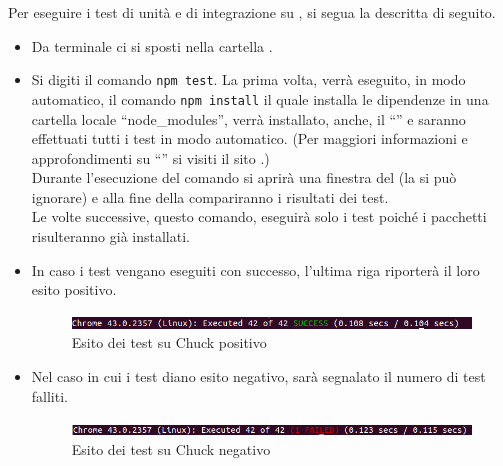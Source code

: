 				Per eseguire i test di unità e di integrazione su , si segua la  descritta di seguito.
					\begin{itemize}
						\item Da terminale ci si sposti nella cartella .
						\item Si digiti il comando \texttt{npm test}. La prima volta, verrà eseguito, in modo automatico, il comando \texttt{npm install} il quale installa le dipendenze in una cartella locale “node\_modules”, verrà installato, anche, il  “” e saranno effettuati tutti i test in modo automatico. (Per maggiori informazioni e approfondimenti su “” si visiti il sito .) \\
						Durante l'esecuzione del comando si aprirà una finestra del  (la si può ignorare) e alla fine della  compariranno i risultati dei test. \\
						Le volte successive, questo comando, eseguirà solo i test poiché i pacchetti risulteranno già installati. \\
						\item In caso i test vengano eseguiti con successo, l'ultima riga riporterà il loro esito positivo.
							\begin{figure}[H]
								\centering
								\includegraphics[scale=0.5]{Pics/testPassed.png}
								\caption{Esito dei test su Chuck positivo}
							\end{figure}
							\item Nel caso in cui i test diano esito negativo, sarà segnalato il numero di test falliti.
							\begin{figure}[H]
								\centering
								\includegraphics[scale=0.5]{Pics/testNotPassed.png}
								\caption{Esito dei test su Chuck negativo}
							\end{figure}
					\end{itemize}
					
